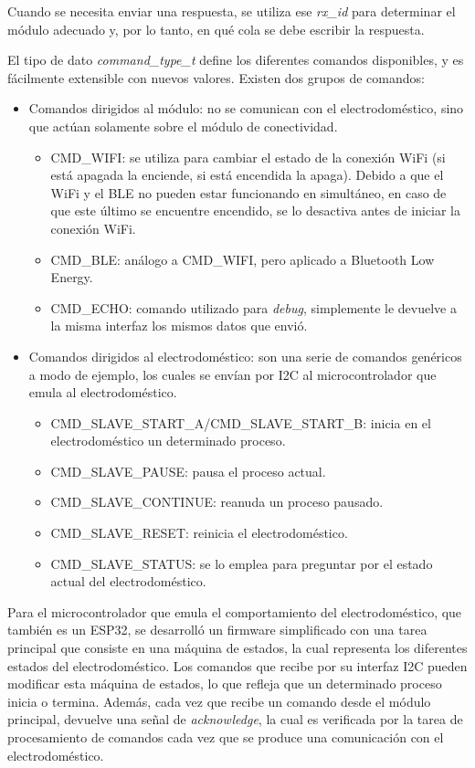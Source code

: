 Cuando se necesita enviar una respuesta, se utiliza ese \emph{rx\_id} para determinar el módulo adecuado y, por lo tanto, en qué cola se debe escribir la respuesta.

El tipo de dato \emph{command\_type\_t} define los diferentes comandos disponibles, y es fácilmente extensible con nuevos valores. Existen dos grupos de comandos:

\begin{itemize}
	\item Comandos dirigidos al módulo: no se comunican con el electrodoméstico, sino que actúan solamente sobre el módulo de conectividad.
	\begin{itemize}
		\item CMD\_WIFI: se utiliza para cambiar el estado de la conexión WiFi (si está apagada la enciende, si está encendida la apaga). Debido a que el WiFi y el BLE no pueden estar funcionando en simultáneo, en caso de que este último se encuentre encendido, se lo desactiva antes de iniciar la conexión WiFi.
		\item CMD\_BLE: análogo a CMD\_WIFI, pero aplicado a Bluetooth Low Energy.
		\item CMD\_ECHO: comando utilizado para \emph{debug}, simplemente le devuelve a la misma interfaz los mismos datos que envió.
	\end{itemize}
	\item Comandos dirigidos al electrodoméstico: son una serie de comandos genéricos a modo de ejemplo, los cuales se envían por I2C al microcontrolador que emula al electrodoméstico.
	\begin{itemize}
		\item CMD\_SLAVE\_START\_A/CMD\_SLAVE\_START\_B: inicia en el electrodoméstico un determinado proceso.
		\item CMD\_SLAVE\_PAUSE: pausa el proceso actual.
		\item CMD\_SLAVE\_CONTINUE: reanuda un proceso pausado.
		\item CMD\_SLAVE\_RESET: reinicia el electrodoméstico.
		\item CMD\_SLAVE\_STATUS: se lo emplea para preguntar por el estado actual del electrodoméstico.
	\end{itemize}
\end{itemize}

Para el microcontrolador que emula el comportamiento del electrodoméstico, que también es un ESP32, se desarrolló un firmware simplificado con una tarea principal que consiste en una máquina de estados, la cual representa los diferentes estados del electrodoméstico. Los comandos que recibe por su interfaz I2C pueden modificar esta máquina de estados, lo que refleja que un determinado proceso inicia o termina. Además, cada vez que recibe un comando desde el módulo principal, devuelve una señal de \emph{acknowledge}, la cual es verificada por la tarea de procesamiento de comandos cada vez que se produce una comunicación con el electrodoméstico.

